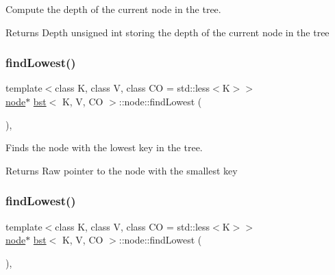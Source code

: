 Compute the depth of the current node in the tree. 

\begin{DoxyReturn}{Returns}
Depth unsigned int storing the depth of the current node in the tree 
\end{DoxyReturn}
\mbox{\label{structbst_1_1node_ae458e2ef45eab2b7ac3d13e361b12e42}} 
\subsubsection{\texorpdfstring{find\+Lowest()}{findLowest()}\hspace{0.1cm}{\footnotesize\ttfamily [1/2]}}
{\footnotesize\ttfamily template$<$class K, class V, class CO = std\+::less$<$\+K$>$$>$ \\
\hyperlink{structbst_1_1node}{node}$\ast$ \hyperlink{classbst}{bst}$<$ K, V, CO $>$\+::node\+::find\+Lowest (\begin{DoxyParamCaption}{ }\end{DoxyParamCaption})\hspace{0.3cm}{\ttfamily [inline]}, {\ttfamily [noexcept]}}



Finds the node with the lowest key in the tree. 

\begin{DoxyReturn}{Returns}
Raw pointer to the node with the smallest key 
\end{DoxyReturn}
\mbox{\label{structbst_1_1node_ae458e2ef45eab2b7ac3d13e361b12e42}} 
\subsubsection{\texorpdfstring{find\+Lowest()}{findLowest()}\hspace{0.1cm}{\footnotesize\ttfamily [2/2]}}
{\footnotesize\ttfamily template$<$class K, class V, class CO = std\+::less$<$\+K$>$$>$ \\
\hyperlink{structbst_1_1node}{node}$\ast$ \hyperlink{classbst}{bst}$<$ K, V, CO $>$\+::node\+::find\+Lowest (\begin{DoxyParamCaption}{ }\end{DoxyParamCaption})\hspace{0.3cm}{\ttfamily [inline]}, {\ttfamily [noexcept]}}



